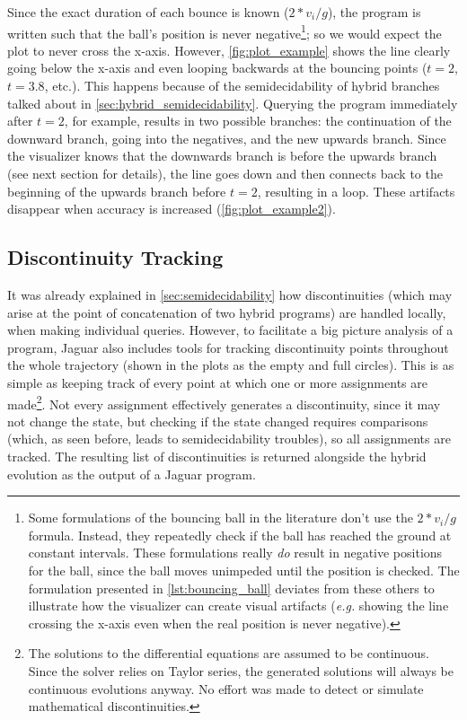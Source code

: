 Since the exact duration of each bounce is known ($2 * v_i / g$), the program is written such that the ball's position is never negative\footnote{Some formulations of the bouncing ball in the literature don't use the $2 * v_i / g$ formula. Instead, they repeatedly check if the ball has reached the ground at constant intervals. These formulations really \textit{do} result in negative positions for the ball, since the ball moves unimpeded until the position is checked. The formulation presented in \cref{lst:bouncing_ball} deviates from these others to illustrate how the visualizer can create visual artifacts (\textit{e.g.} showing the line crossing the x-axis even when the real position is never negative).}; so we would expect the plot to never cross the x-axis. However, \cref{fig:plot_example} shows the line clearly going below the x-axis and even looping backwards at the bouncing points ($t=2$, $t=3.8$, etc.). This happens because of the semidecidability of hybrid branches talked about in \cref{sec:hybrid_semidecidability}. Querying the program immediately after $t=2$, for example, results in two possible branches: the continuation of the downward branch, going into the negatives, and the new upwards branch. Since the visualizer knows that the downwards branch is before the upwards branch (see next section for details), the line goes down and then connects back to the beginning of the upwards branch before $t=2$, resulting in a loop. These artifacts disappear when accuracy is increased (\cref{fig:plot_example2}).



\subsection{Discontinuity Tracking}
\label{sec:discontinuities}

It was already explained in \cref{sec:semidecidability} how discontinuities (which may arise at the point of concatenation of two hybrid programs) are handled locally, when making individual queries. However, to facilitate a big picture analysis of a program, Jaguar also includes tools for tracking discontinuity points throughout the whole trajectory (shown in the plots as the empty and full circles). This is as simple as keeping track of every point at which one or more assignments are made\footnote{The solutions to the differential equations are assumed to be continuous. Since the solver relies on Taylor series, the generated solutions will always be continuous evolutions anyway. No effort was made to detect or simulate mathematical discontinuities.}. Not every assignment effectively generates a discontinuity, since it may not change the state, but checking if the state changed requires comparisons (which, as seen before, leads to semidecidability troubles), so all assignments are tracked. The resulting list of discontinuities is returned alongside the hybrid evolution as the output of a Jaguar program.


